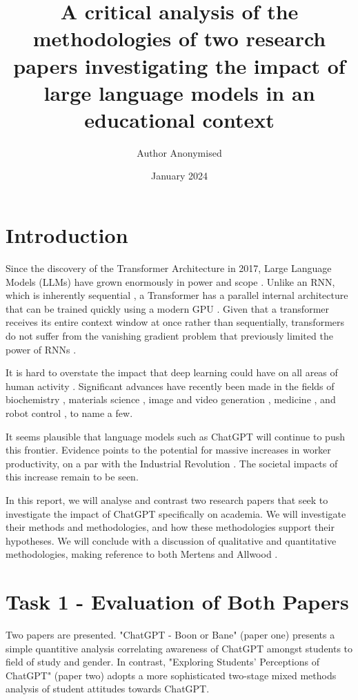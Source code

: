 \documentclass[12pt]{article}
\title{A critical analysis of the methodologies of two research papers investigating the impact of large language models in an educational context}
\author{Author Anonymised}
\date{January 2024}
\begin{document}
\maketitle

\section{Introduction}

Since the discovery of the Transformer Architecture in 2017, Large Language Models (LLMs) have grown enormously in power and scope \cite{kaplan2020scaling}. Unlike an RNN, which is inherently sequential \cite{cho2014learning}, a Transformer has a parallel internal architecture that can be trained quickly using a modern GPU \cite{vaswani}. Given that a transformer receives its entire context window at once rather than sequentially, transformers do not suffer from the vanishing gradient problem that previously limited the power of RNNs \cite{hochreiter, kuchaiev2018factorization}. 

It is hard to overstate the impact that deep learning could have on all areas of human activity \cite{noy}. Significant advances have recently been made in the fields of biochemistry \cite{alphafold}, materials science \cite{Merchant2023}, image and video generation \cite{ho2020denoising, yang2023diffusion}, medicine \cite{Wong2023}, and robot control \cite{anymal}, to name a few. 

It seems plausible that language models such as ChatGPT will continue to push this frontier. Evidence points to the potential for massive increases in worker productivity, on a par with the Industrial Revolution \cite{noy}. The societal impacts of this increase remain to be seen.

In this report, we will analyse and contrast two research papers that seek to investigate the impact of ChatGPT specifically on academia. We will investigate their methods and methodologies, and how these methodologies support their hypotheses. We will conclude with a discussion of qualitative and quantitative methodologies, making reference to both Mertens \cite{mertens} and Allwood \cite{allwood}.


\section{Task 1 - Evaluation of Both Papers}

Two papers are presented. "ChatGPT - Boon or Bane" (paper one) \cite{paper1} presents a simple quantitive analysis correlating awareness of ChatGPT amongst students to field of study and gender. In contrast, "Exploring Students' Perceptions of ChatGPT" (paper two) \cite{paper2} adopts a more sophisticated two-stage mixed methods analysis of student attitudes towards ChatGPT.
\end{document}
